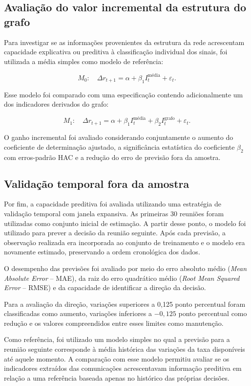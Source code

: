 \subsection{Avaliação do valor incremental da estrutura do grafo}

Para investigar se as informações provenientes da estrutura da rede acrescentam
capacidade explicativa ou preditiva à classificação individual dos sinais, foi
utilizada a média simples como modelo de referência:

\[
M_0:
\quad
\Delta r_{t+1}
=
\alpha+\beta_1I^{\text{média}}_t+\varepsilon_t.
\]

Esse modelo foi comparado com uma especificação contendo adicionalmente um dos
indicadores derivados do grafo:

\[
M_1:
\quad
\Delta r_{t+1}
=
\alpha+\beta_1I^{\text{média}}_t
+\beta_2I^{\text{grafo}}_t+\varepsilon_t.
\]

O ganho incremental foi avaliado considerando conjuntamente o aumento do
coeficiente de determinação ajustado, a significância estatística do coeficiente
$\beta_2$ com erros-padrão HAC e a redução do erro de previsão fora da amostra.

\subsection{Validação temporal fora da amostra}

Por fim, a capacidade preditiva foi avaliada utilizando uma estratégia de
validação temporal com janela expansiva. As primeiras 30 reuniões foram
utilizadas como conjunto inicial de estimação. A partir desse ponto, o modelo
foi utilizado para prever a decisão da reunião seguinte. Após cada previsão, a
observação realizada era incorporada ao conjunto de treinamento e o modelo era
novamente estimado, preservando a ordem cronológica dos dados.

O desempenho das previsões foi avaliado por meio do erro absoluto médio
(\textit{Mean Absolute Error} -- MAE), da raiz do erro quadrático médio
(\textit{Root Mean Squared Error} -- RMSE) e da capacidade de identificar a
direção da decisão.

Para a avaliação da direção, variações superiores a 0,125 ponto percentual foram
classificadas como aumento, variações inferiores a $-0,125$ ponto percentual
como redução e os valores compreendidos entre esses limites como manutenção.

Como referência, foi utilizado um modelo simples no qual a previsão para a
reunião seguinte corresponde à média histórica das variações da taxa disponíveis
até aquele momento. A comparação com esse modelo permitiu avaliar se os
indicadores extraídos das comunicações acrescentavam informação preditiva em
relação a uma referência baseada apenas no histórico das próprias decisões.